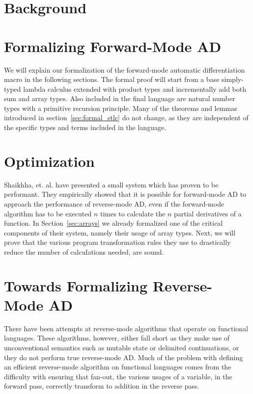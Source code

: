 \documentclass[11pt, final]{article}
\begin{document}

\newpage


\newpage

\setcounter{page}{3}
\tableofcontents
\newpage



\section{Background}





% 

\section{Formalizing Forward-Mode AD}\label{sec:forward}
  We will explain our formalization of the forward-mode automatic differentiation macro in the following sections.
  The formal proof will start from a base simply-typed lambda calculus extended with product types and incrementally add both sum and array types.
  Also included in the final language are natural number types with a primitive recursion principle.
  Many of the theorems and lemmas introduced in section~\ref{sec:formal_stlc} do not change, as they are independent of the specific types and terms included in the language.
  
  
  
\section{Optimization}
  Shaikhha, et. al. have presented a small system which has proven to be performant\cite{Shaikha2019}.
  They empirically showed that it is possible for forward-mode AD to approach the performance of reverse-mode AD, even if the forward-mode algorithm has to be executed $n$ times to calculate the $n$ partial derivatives of a function.
  In Section~\ref{sec:arrays} we already formalized one of the critical components of their system, namely their usage of array types.
  Next, we will prove that the various program transformation rules they use to drastically reduce the number of calculations needed, are sound.
  
\section{Towards Formalizing Reverse-Mode AD}
  There have been attempts at reverse-mode algorithms that operate on functional languages\cite{ShiftReset:Backprop}\cite{Brunel2020BackpropagationIT}\cite{PearlmutterSiskind2008}.
  These algorithms, however, either fall short as they make use of unconventional semantics such as mutable state or delimited continuations, or they do not perform true reverse-mode AD.
  Much of the problem with defining an efficient reverse-mode algorithm on functional languages comes from the difficulty with ensuring that fan-out, the various usages of a variable, in the forward pass, correctly transform to addition in the reverse pass.
\end{document}
